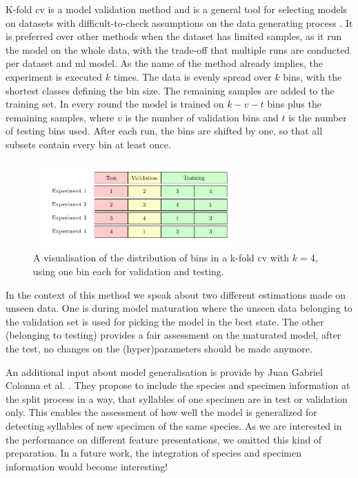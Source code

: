 K-fold \gls{cv} is a model validation method and is a general tool for selecting models on datasets with difficult-to-check assumptions on the data generating process \cite{Zhang2015}.
It is preferred over other methods when the dataset has limited samples, as it run the model on the whole data, with the trade-off that multiple runs are conducted per dataset and \gls{ml} model.
As the name of the method already implies, the experiment is executed $k$ times.
The data is evenly spread over $k$ bins, with the shortest classes defining the bin size. The remaining samples are added to the training set.
In every round the model is trained on $k-v-t$ bins plus the remaining samples, where $v$ is the number of validation bins and $t$ is the number of testing bins used. After each run, the bins are shifted by one, so that all subsets contain every bin at least once.
\begin{figure}[H]
\centering
  \includegraphics[width=0.7\textwidth]{image/k-fold_cv.pdf}
  \caption{A visualisation of the distribution of bins in a k-fold \gls{cv} with $k=4$, using one bin each for validation and testing.}
  \label{fig:k-fold_cv}
\end{figure}
In the context of this method we speak about two different estimations made on unseen data. One is during model maturation where the unseen data belonging to the validation set is used for picking the model in the best state. The other (belonging to testing) provides a fair assessment on the maturated model, after the test, no changes on the (hyper)parameters should be made anymore.

An additional input about model generalisation is provide by Juan Gabriel Colonna et al. \cite{Colonna2016}.
They propose to include the species and specimen information at the split process in a way, that syllables of one specimen are in test or validation only. This enables the assessment of how well the model is generalized for detecting syllables of new specimen of the same species. As we are interested in the performance on different feature presentations, we omitted this kind of preparation. In a future work, the integration of species and specimen information would become interesting!

